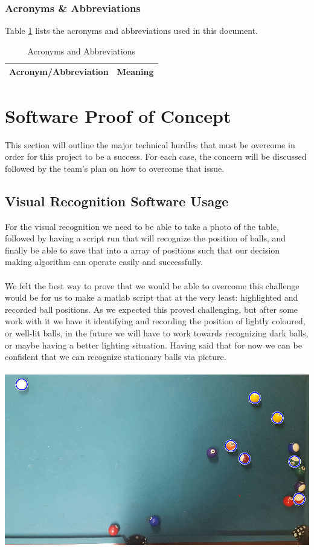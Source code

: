 \documentclass[titlepage]{article}
\begin{document}
\newpage
\subsubsection{Acronyms \& Abbreviations}
Table \ref{tab:Acronyms} lists the acronyms and abbreviations used in this document.
\begin{table}[h!]
\centering
\caption{Acronyms and Abbreviations}
\begin{tabular}{| p{6cm} | p{6cm} |}\hline
	\textbf{Acronym/Abbreviation}	&\textbf{Meaning}\\\hline
\end{tabular}
\label{tab:Acronyms}
\end{table}


\section{Software Proof of Concept}
This section will outline the major technical hurdles that must be overcome in order for this project to be a success. For each case, the concern will be discussed followed by the team's plan on how to overcome that issue.

\subsection{Visual Recognition Software Usage}
For the visual recognition we need to be able to take a photo of the table, followed by having a script run that will recognize the position of balls, and finally be able to save that into a array of positions such that our decision making algorithm can operate easily and successfully. \\ \\
We felt the best way to prove that we would be able to overcome this challenge would be for us to make a matlab script that at the very least: highlighted and recorded ball positions. As we expected this proved challenging, but after some work with it we have it identifying and recording the position of lightly coloured, or well-lit balls, in the future we will have to work towards recognizing dark balls, or maybe having a better lighting situation. Having said that for now we can be confident that we can recognize stationary balls via picture. \\ \\

\includegraphics{gotsomeballs.PNG}
\pagebreak
\end{document}
